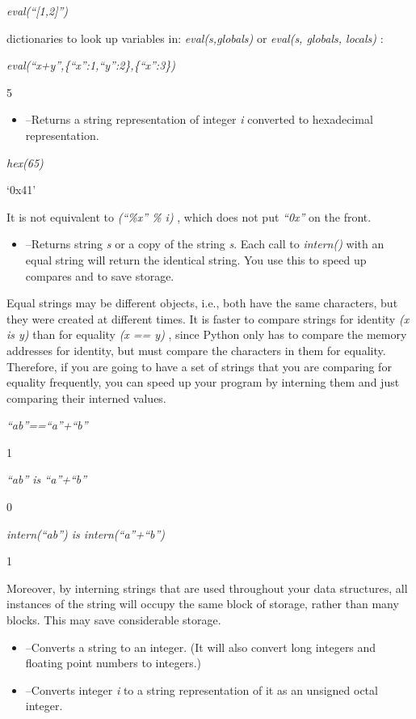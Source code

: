 \emph{eval(``{[}1,2{]}'')}




dictionaries to look up variables in: \emph{eval(s,globals)} or
\emph{eval(s, globals, locals)} :


\emph{eval(``x+y'',\{``x'':1,``y'':2\},\{``x'':3\})}

5

\begin{itemize}

\item
   --Returns a string
  representation of integer \emph{i} converted to hexadecimal
  representation.
\end{itemize}


\emph{hex(65)}

`0x41'

It is not equivalent to
\emph{(``\%x'' \% i)} , which does not put \emph{``0x''} on the front.

\begin{itemize}

\item
   --Returns
  string \emph{s} or a copy of the string \emph{s}. Each call to
  \emph{intern()} with an equal string will return the identical string.
  You use this to speed up compares and to save storage.
\end{itemize}

Equal strings may be different
objects, i.e., both have the same characters, but they were created at
different times. It is faster to compare strings for identity \emph{(x
is y)} than for equality \emph{(x == y)} , since Python only has to
compare the memory addresses for identity, but must compare the
characters in them for equality. Therefore, if you are going to have a
set of strings that you are comparing for equality frequently, you can
speed up your program by interning them and just comparing their
interned values.


\emph{``ab''==``a''+``b''}

1


\emph{``ab'' is ``a''+``b''}

0


\emph{intern(``ab'') is intern(``a''+``b'')}

1

Moreover, by interning strings that
are used throughout your data structures, all instances of the string
will occupy the same block of storage, rather than many blocks. This may
save considerable storage.

\begin{itemize}

\item
   --Converts a
  string to an integer. (It will also convert long integers and floating
  point numbers to integers.)
\item
   --Converts integer
  \emph{i} to a string representation of it as an unsigned octal
  integer.
\end{itemize}



